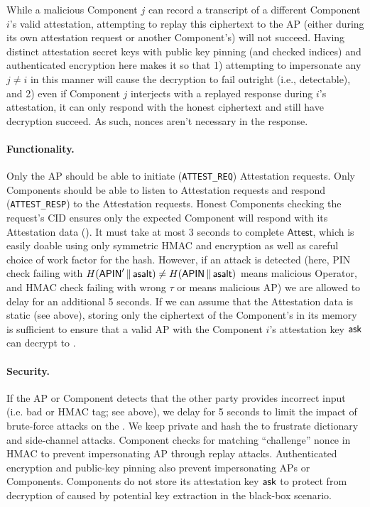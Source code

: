 \iflong
\begin{rem}
    While a malicious Component $j$ can record a transcript of a different Component $i$'s valid attestation, attempting to replay this ciphertext to the AP (either during its own attestation request or another Component's) will not succeed. Having distinct attestation secret keys with public key pinning (and checked indices) and authenticated encryption here makes it so that 1) attempting to impersonate any $j \neq i$ in this manner will cause the decryption to fail outright (i.e., detectable), and 2) even if Component $j$ interjects with a replayed response during $i$'s attestation, it can only respond with the honest ciphertext and still have decryption succeed. As such, nonces aren't necessary in the response.
\end{rem}
\fi

\paragraph{Functionality.} Only the AP should be able to initiate (\texttt{ATTEST\_REQ}) Attestation requests. Only Components should be able to listen to Attestation requests and respond (\texttt{ATTEST\_RESP}) to the Attestation requests. Honest Components checking the request's CID ensures only the expected Component will respond with its Attestation data (\adata). It must take at most 3 seconds to complete $\mathsf{Attest}$, which is easily doable using only symmetric HMAC and encryption as well as careful choice of work factor for the \apin hash. However, if an attack is detected (here, PIN check failing with $H(\mathsf{APIN}' \,\Vert\, \mathsf{asalt}) \neq H(\mathsf{APIN} \,\Vert\, \mathsf{asalt})$ means malicious Operator, and HMAC check failing with wrong $\tau$ or \nonce means malicious AP) we are allowed to delay for an additional 5 seconds. If we can assume that the Attestation data is static (see above), storing only the ciphertext of the Component's \adata in its memory is sufficient to ensure that a valid AP with the Component $i$'s attestation key $\mathsf{ask}$ can decrypt to \adata.

\paragraph{Security.} If the AP or Component detects that the other party provides incorrect input (i.e. bad \apin or HMAC tag; see above), we delay for 5 seconds to limit the impact of brute-force attacks on the \apin. We keep \asalt private and hash the \apin to frustrate dictionary and side-channel attacks. Component checks for matching ``challenge'' nonce in HMAC to prevent impersonating AP \iflong through replay attacks\fi. Authenticated encryption and public-key pinning also prevent impersonating APs or Components. Components do not store its attestation key $\mathsf{ask}$ \iflong to protect from decryption of \adata caused by potential key extraction in the black-box scenario\fi.%

